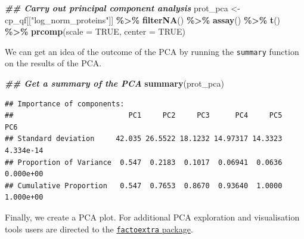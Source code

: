 \documentclass[9pt,a4paper,]{extarticle}
\newenvironment{Shaded}{\begin{snugshade}}{\end{snugshade}}
\newcommand{\AttributeTok}[1]{\textcolor[rgb]{0.13,0.29,0.53}{#1}}
\newcommand{\ConstantTok}[1]{\textcolor[rgb]{0.56,0.35,0.01}{#1}}
\newcommand{\DocumentationTok}[1]{\textcolor[rgb]{0.56,0.35,0.01}{\textbf{\textit{#1}}}}
\newcommand{\FunctionTok}[1]{\textcolor[rgb]{0.13,0.29,0.53}{\textbf{#1}}}
\newcommand{\NormalTok}[1]{#1}
\newcommand{\OtherTok}[1]{\textcolor[rgb]{0.56,0.35,0.01}{#1}}
\newcommand{\SpecialCharTok}[1]{\textcolor[rgb]{0.81,0.36,0.00}{\textbf{#1}}}
\newcommand{\StringTok}[1]{\textcolor[rgb]{0.31,0.60,0.02}{#1}}
\begin{document}
\begin{Shaded}
\begin{Highlighting}[]
\DocumentationTok{\#\# Carry out principal component analysis}
\NormalTok{prot\_pca }\OtherTok{\textless{}{-}}\NormalTok{ cp\_qf[[}\StringTok{"log\_norm\_proteins"}\NormalTok{]] }\SpecialCharTok{\%\textgreater{}\%}
  \FunctionTok{filterNA}\NormalTok{() }\SpecialCharTok{\%\textgreater{}\%}
  \FunctionTok{assay}\NormalTok{() }\SpecialCharTok{\%\textgreater{}\%}
  \FunctionTok{t}\NormalTok{() }\SpecialCharTok{\%\textgreater{}\%}
  \FunctionTok{prcomp}\NormalTok{(}\AttributeTok{scale =} \ConstantTok{TRUE}\NormalTok{, }\AttributeTok{center =} \ConstantTok{TRUE}\NormalTok{)}
\end{Highlighting}
\end{Shaded}

We can get an idea of the outcome of the PCA by running the \texttt{summary} function
on the results of the PCA.

\begin{Shaded}
\begin{Highlighting}[]
\DocumentationTok{\#\# Get a summary of the PCA}
\FunctionTok{summary}\NormalTok{(prot\_pca)}
\end{Highlighting}
\end{Shaded}

\begin{verbatim}
## Importance of components:
##                           PC1     PC2     PC3      PC4     PC5       PC6
## Standard deviation     42.035 26.5522 18.1232 14.97317 14.3323 4.334e-14
## Proportion of Variance  0.547  0.2183  0.1017  0.06941  0.0636 0.000e+00
## Cumulative Proportion   0.547  0.7653  0.8670  0.93640  1.0000 1.000e+00
\end{verbatim}

Finally, we create a PCA plot. For additional PCA exploration and visualisation
tools users are directed to the \href{https://cran.r-project.org/web/packages/factoextra/index.html}{\texttt{factoextra} package}.
\end{document}
